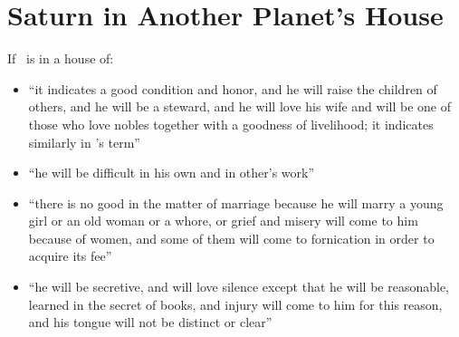 \section{Saturn in Another Planet's House}
If \Saturn\, is in a house of:
\begin{itemize}[topsep=0em,itemsep=0em]
\item[\Jupiter] ``it indicates a good condition and honor, and he will raise the children of others, and he will be a steward, and he will love his wife and will be one of those who love nobles together with a goodness of livelihood; it indicates similarly in \Jupiter's term''

\item[\Mars] ``he will be difficult in his own and in other's work''

\item[\Venus] ``there is no good in the matter of marriage because he will marry a young girl or an old woman or a whore, or grief and misery will come to him because of women, and some of them will come to fornication in order to acquire its fee''

\item[\Mercury] ``he will be secretive, and will love silence except that he will be reasonable, learned in the secret of books, and injury will come to him for this reason, and his tongue will not be distinct or clear''


\end{itemize}